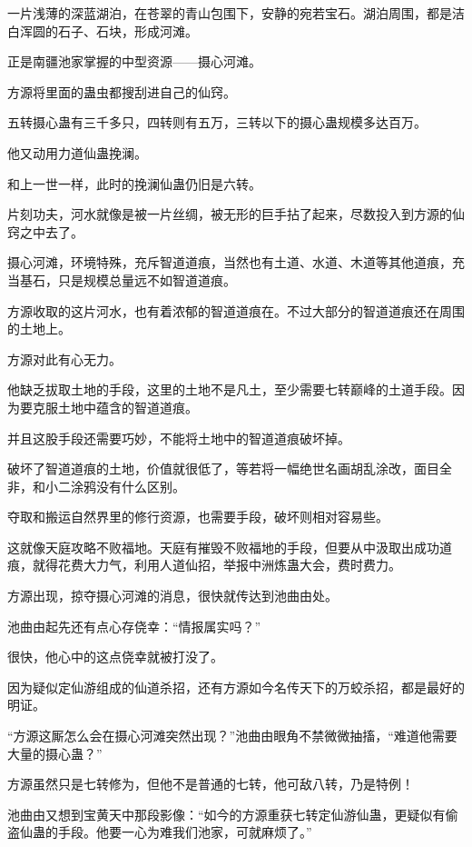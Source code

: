 
\begin{this_body}

一片浅薄的深蓝湖泊，在苍翠的青山包围下，安静的宛若宝石。湖泊周围，都是洁白浑圆的石子、石块，形成河滩。

正是南疆池家掌握的中型资源——摄心河滩。

方源将里面的蛊虫都搜刮进自己的仙窍。

五转摄心蛊有三千多只，四转则有五万，三转以下的摄心蛊规模多达百万。

他又动用力道仙蛊挽澜。

和上一世一样，此时的挽澜仙蛊仍旧是六转。

片刻功夫，河水就像是被一片丝绸，被无形的巨手拈了起来，尽数投入到方源的仙窍之中去了。

摄心河滩，环境特殊，充斥智道道痕，当然也有土道、水道、木道等其他道痕，充当基石，只是规模总量远不如智道道痕。

方源收取的这片河水，也有着浓郁的智道道痕在。不过大部分的智道道痕还在周围的土地上。

方源对此有心无力。

他缺乏拔取土地的手段，这里的土地不是凡土，至少需要七转巅峰的土道手段。因为要克服土地中蕴含的智道道痕。

并且这股手段还需要巧妙，不能将土地中的智道道痕破坏掉。

破坏了智道道痕的土地，价值就很低了，等若将一幅绝世名画胡乱涂改，面目全非，和小二涂鸦没有什么区别。

夺取和搬运自然界里的修行资源，也需要手段，破坏则相对容易些。

这就像天庭攻略不败福地。天庭有摧毁不败福地的手段，但要从中汲取出成功道痕，就得花费大力气，利用人道仙招，举报中洲炼蛊大会，费时费力。

方源出现，掠夺摄心河滩的消息，很快就传达到池曲由处。

池曲由起先还有点心存侥幸：“情报属实吗？”

很快，他心中的这点侥幸就被打没了。

因为疑似定仙游组成的仙道杀招，还有方源如今名传天下的万蛟杀招，都是最好的明证。

“方源这厮怎么会在摄心河滩突然出现？”池曲由眼角不禁微微抽搐，“难道他需要大量的摄心蛊？”

方源虽然只是七转修为，但他不是普通的七转，他可敌八转，乃是特例！

池曲由又想到宝黄天中那段影像：“如今的方源重获七转定仙游仙蛊，更疑似有偷盗仙蛊的手段。他要一心为难我们池家，可就麻烦了。”


\end{this_body}
